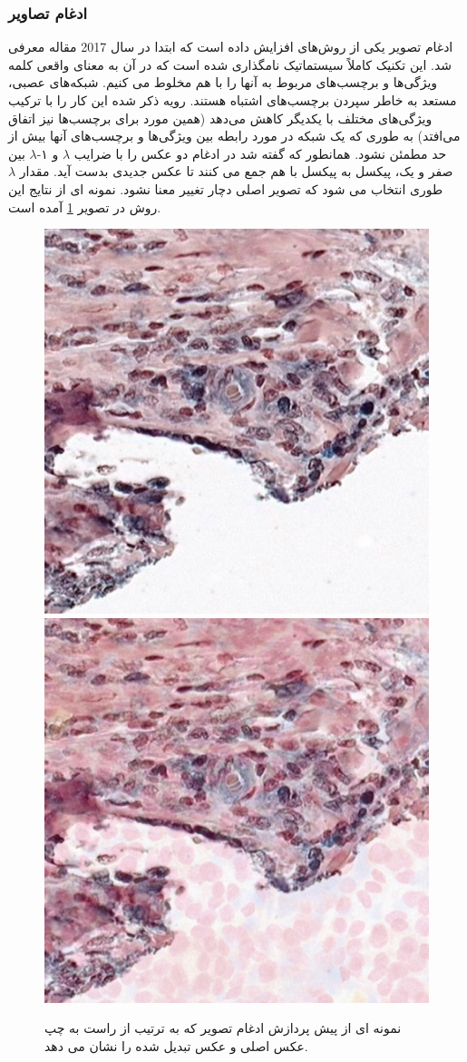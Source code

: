 \subsubsection{ادغام تصاویر}
ادغام تصویر یکی از روش‌های افزایش داده است که ابتدا در سال 2017 مقاله
\cite{zhang2017mixup}
معرفی شد.
این تکنیک کاملاً سیستماتیک نامگذاری شده است که در آن به معنای واقعی کلمه ویژگی‌ها و برچسب‌های مربوط به آنها را با هم مخلوط می کنیم. شبکه‌های عصبی، مستعد به خاطر سپردن برچسب‌های اشتباه هستند. رویه ذکر شده این کار را با ترکیب ویژگی‌های مختلف با یکدیگر کاهش می‌دهد (همین مورد برای برچسب‌ها نیز اتفاق می‌افتد) به طوری که یک شبکه در مورد رابطه بین ویژگی‌ها و برچسب‌های آنها بیش از حد مطمئن نشود.
همانطور که گفته شد در ادغام دو عکس را با ضرایب $\lambda$ و ۱-$\lambda$ بین صفر و یک، پیکسل به پیکسل با هم جمع می کنند تا عکس جدیدی بدست آید. مقدار $\lambda$ طوری انتخاب می شود که تصویر اصلی دچار تغییر معنا نشود.
نمونه ای از نتایج این روش در تصویر \ref{mixup augmentation} آمده است.
\begin{figure}
    \begin{center}
        \includegraphics[width=0.48\linewidth]{figs/suggested_methods/subs/data_augmentation/mixup_776-original.jpeg}
        \includegraphics[width=0.48\linewidth]{figs/suggested_methods/subs/data_augmentation/mixup_776-transformed.jpeg}
    \end{center}
    \caption{نمونه ای از پیش پردازش ادغام تصویر که به ترتیب از راست به چپ عکس اصلی و عکس تبدیل شده را نشان می دهد.}
    \label{mixup augmentation}
\end{figure}

